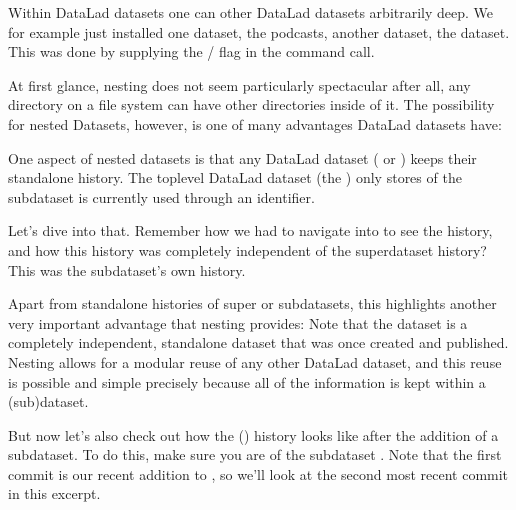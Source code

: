 \sphinxAtStartPar
Within DataLad datasets one can  other DataLad
datasets arbitrarily deep. We for example just installed one dataset, the
 podcasts,  another dataset, the  dataset.
This was done by supplying the / flag in the command call.

\sphinxAtStartPar
At first glance, nesting does not seem particularly spectacular \textendash{}
after all, any directory on a file system can have other directories inside of it.
The possibility for nested Datasets, however, is one of many advantages
DataLad datasets have:

\sphinxAtStartPar
One aspect of nested datasets is that any DataLad dataset
( or ) keeps their stand\sphinxhyphen{}alone
history. The top\sphinxhyphen{}level DataLad dataset (the ) only stores
 of the subdataset is currently used through an identifier.

\sphinxAtStartPar
Let’s dive into that.
Remember how we had to navigate into  to see the history,
and how this history was completely independent of the 
superdataset history? This was the subdataset’s own history.

\enlargethispage{.5\baselineskip}
\sphinxAtStartPar
Apart from stand\sphinxhyphen{}alone histories of super\sphinxhyphen{} or subdatasets, this highlights another
very important advantage that nesting provides: Note that the  dataset
is a completely independent, standalone dataset that was once created and
published. Nesting allows for a modular reuse of any other DataLad dataset,
and this reuse is possible and simple precisely because all of the information
is kept within a (sub)dataset.

\sphinxAtStartPar
But now let’s also check out how the  () history
looks like after the addition of a subdataset. To do this, make sure you are
 of the subdataset . Note that the first commit is our recent
addition to , so we’ll look at the second most recent commit in
this excerpt.

